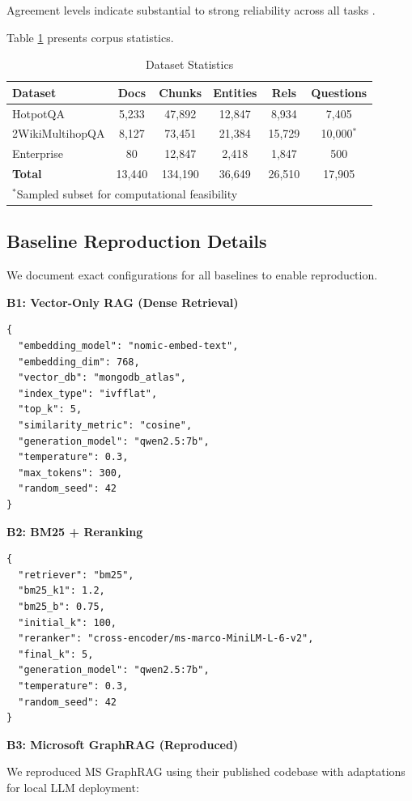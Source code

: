 \documentclass[conference]{IEEEtran}
\begin{document}
Agreement levels indicate substantial to strong reliability across all tasks \cite{landis1977measurement}.

Table \ref{tab:datasets} presents corpus statistics.

\begin{table}[htbp]
\caption{Dataset Statistics}
\label{tab:datasets}
\centering
\begin{tabular}{lccccc}
\toprule
\textbf{Dataset} & \textbf{Docs} & \textbf{Chunks} & \textbf{Entities} & \textbf{Rels} & \textbf{Questions} \\
\midrule
HotpotQA & 5,233 & 47,892 & 12,847 & 8,934 & 7,405 \\
2WikiMultihopQA & 8,127 & 73,451 & 21,384 & 15,729 & 10,000$^*$ \\
Enterprise & 80 & 12,847 & 2,418 & 1,847 & 500 \\
\midrule
\textbf{Total} & 13,440 & 134,190 & 36,649 & 26,510 & 17,905 \\
\bottomrule
\multicolumn{6}{l}{\footnotesize $^*$Sampled subset for computational feasibility}
\end{tabular}
\end{table}

\subsection{Baseline Reproduction Details}

We document exact configurations for all baselines to enable reproduction.

\textbf{B1: Vector-Only RAG (Dense Retrieval)}
\begin{verbatim}
{
  "embedding_model": "nomic-embed-text",
  "embedding_dim": 768,
  "vector_db": "mongodb_atlas",
  "index_type": "ivfflat",
  "top_k": 5,
  "similarity_metric": "cosine",
  "generation_model": "qwen2.5:7b",
  "temperature": 0.3,
  "max_tokens": 300,
  "random_seed": 42
}
\end{verbatim}

\textbf{B2: BM25 + Reranking}
\begin{verbatim}
{
  "retriever": "bm25",
  "bm25_k1": 1.2,
  "bm25_b": 0.75,
  "initial_k": 100,
  "reranker": "cross-encoder/ms-marco-MiniLM-L-6-v2",
  "final_k": 5,
  "generation_model": "qwen2.5:7b",
  "temperature": 0.3,
  "random_seed": 42
}
\end{verbatim}

\textbf{B3: Microsoft GraphRAG (Reproduced)}

We reproduced MS GraphRAG using their published codebase with adaptations for local LLM deployment:
\end{document}
